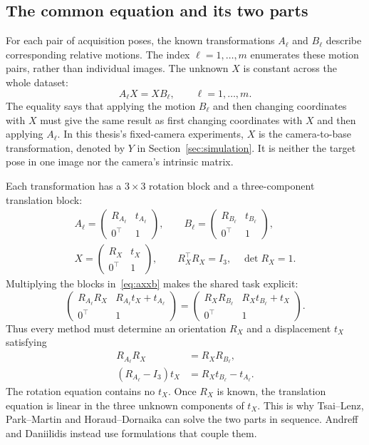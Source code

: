 \documentclass[12pt,a4paper]{article}
\begin{document}
\subsection{The common equation and its two parts}\label{sec:common-problem}
For each pair of acquisition poses, the known transformations $A_\ell$ and $B_\ell$ describe corresponding relative motions. The index $\ell=1,\ldots,m$ enumerates these motion pairs, rather than individual images. The unknown $X$ is constant across the whole dataset:
\begin{equation}\label{eq:axxb}
A_\ell X=XB_\ell,\qquad \ell=1,\ldots,m.
\end{equation}
The equality says that applying the motion $B_\ell$ and then changing coordinates with $X$ must give the same result as first changing coordinates with $X$ and then applying $A_\ell$. In this thesis's fixed-camera experiments, $X$ is the camera-to-base transformation, denoted by $Y$ in Section~\ref{sec:simulation}. It is neither the target pose in one image nor the camera's intrinsic matrix.

Each transformation has a $3\times3$ rotation block and a three-component translation block:
\begin{equation}\label{eq:rigid-blocks}
\begin{gathered}
A_\ell=\begin{pmatrix}R_{A_\ell}&t_{A_\ell}\\0^\top&1\end{pmatrix},\qquad
B_\ell=\begin{pmatrix}R_{B_\ell}&t_{B_\ell}\\0^\top&1\end{pmatrix},\\
X=\begin{pmatrix}R_X&t_X\\0^\top&1\end{pmatrix},\qquad
R_X^\top R_X=I_3,\quad \det R_X=1.
\end{gathered}
\end{equation}
Multiplying the blocks in~\eqref{eq:axxb} makes the shared task explicit:
\begin{equation}\label{eq:axxb-expanded}
\begin{pmatrix}
R_{A_\ell}R_X&R_{A_\ell}t_X+t_{A_\ell}\\0^\top&1
\end{pmatrix}
=
\begin{pmatrix}
R_XR_{B_\ell}&R_Xt_{B_\ell}+t_X\\0^\top&1
\end{pmatrix}.
\end{equation}
Thus every method must determine an orientation $R_X$ and a displacement $t_X$ satisfying
\begin{align}
R_{A_\ell}R_X&=R_XR_{B_\ell},\label{eq:axxb-rotation}\\
(R_{A_\ell}-I_3)t_X&=R_Xt_{B_\ell}-t_{A_\ell}.\label{eq:axxb-translation}
\end{align}
The rotation equation contains no $t_X$. Once $R_X$ is known, the translation equation is linear in the three unknown components of $t_X$. This is why Tsai--Lenz, Park--Martin and Horaud--Dornaika can solve the two parts in sequence. Andreff and Daniilidis instead use formulations that couple them.
\end{document}
